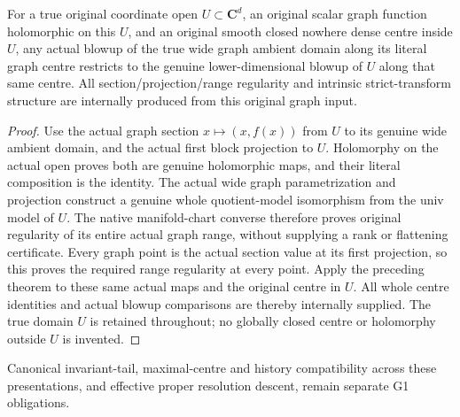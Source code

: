 \begin{theorem}
\label{hir:actual-open-graph-contact-restricted-blowup}
\leanok
For a true original coordinate open $U\subset\mathbf C^d$, an original
scalar graph function holomorphic on this $U$, and an original smooth
closed nowhere dense centre inside $U$, any actual blowup of the true
wide graph ambient domain along its literal graph centre restricts to
the genuine lower-dimensional blowup of $U$ along that same centre.
All section/projection/range regularity and intrinsic strict-transform
structure are internally produced from this original graph input.
\end{theorem}
\begin{proof}
Use the actual graph section $x\mapsto(x,f(x))$ from $U$ to its genuine
wide ambient domain, and the actual first block projection to $U$.
Holomorphy on the actual open proves both are genuine holomorphic maps,
and their literal composition is the identity. The actual wide graph
parametrization and projection construct a genuine whole quotient-model
isomorphism from the univ model of $U$. The native manifold-chart converse
therefore proves original regularity of its entire actual graph range,
without supplying a rank or flattening certificate. Every graph point is
the actual section value at its first projection, so this proves the
required range regularity at every point. Apply the preceding theorem
to these same actual maps and the original centre in $U$. All whole centre
identities and actual blowup comparisons are thereby internally supplied.
The true domain $U$ is retained throughout; no globally closed centre or
holomorphy outside $U$ is invented.
\end{proof}

Canonical invariant-tail, maximal-centre and history compatibility across
these presentations, and effective proper resolution descent, remain
separate G1 obligations.
